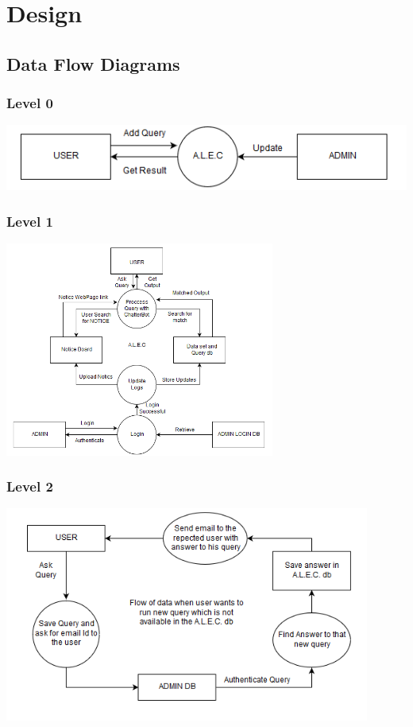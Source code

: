 \documentclass{mnnit}
\begin{document}
\chapter{Design}
\section{Data Flow Diagrams}
\subsection{Level 0}
\includegraphics[width=\textwidth]{images/l1.PNG}
\subsection{Level 1}
\includegraphics[width=\textwidth, height=200pt]{images/l2.PNG}
\subsection{Level 2}
\includegraphics[width=\textwidth, height=200pt]{images/l3.PNG}
\end{document}
